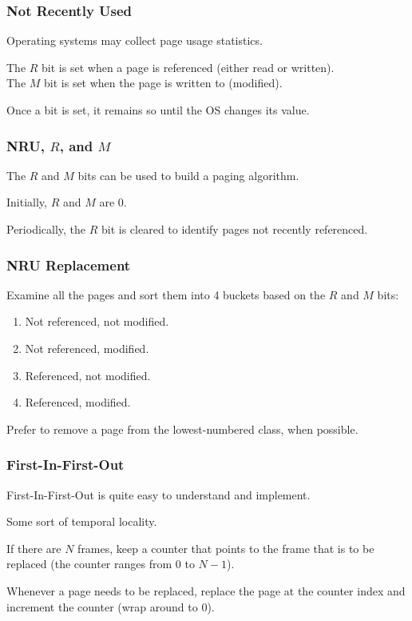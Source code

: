 \begin{frame}
\frametitle{Not Recently Used}

Operating systems may collect page usage statistics. 


The $R$ bit is set when a page is referenced (either read or written).\\
The $M$ bit is set when the page is written to (modified). 

Once a bit is set, it remains so until the OS changes its value. 

\end{frame}

\begin{frame}
\frametitle{NRU, $R$, and $M$}

The $R$ and $M$ bits can be used to build a paging algorithm.

Initially, $R$ and $M$ are 0. 

Periodically, the $R$ bit is cleared to identify pages not recently referenced. 

\end{frame}


\begin{frame}
\frametitle{NRU Replacement}

Examine all the pages and sort them into 4 buckets based on the $R$ and $M$ bits:

\begin{enumerate}
	\item Not referenced, not modified.
	\item Not referenced, modified.
	\item Referenced, not modified.
	\item Referenced, modified.
\end{enumerate}

Prefer to remove a page from the lowest-numbered class, when possible. 

\end{frame}

\begin{frame}
\frametitle{First-In-First-Out}

First-In-First-Out is quite easy to understand and implement. 

Some sort of temporal locality. 

If there are $N$ frames, keep a counter that points to the frame that is to be replaced (the counter ranges from $0$ to $N-1$). 

Whenever a page needs to be replaced, replace the page at the counter index and increment the counter (wrap around to 0).


\end{frame}

